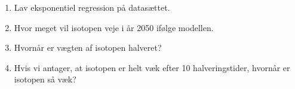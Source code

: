 \begin{enumerate}[label=\roman*)]
	\item Lav eksponentiel regression på datasættet.
	\item Hvor meget vil isotopen veje i år 2050 ifølge modellen.
	\item Hvornår er vægten af isotopen halveret?
	\item Hvis vi antager, at isotopen er helt væk efter 10 halveringstider, hvornår er isotopen så væk?
\end{enumerate}

